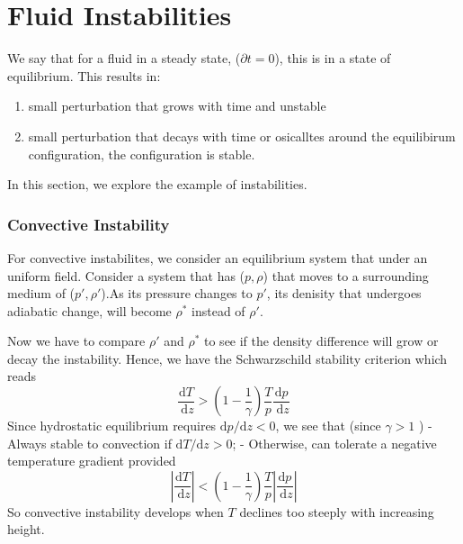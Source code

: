 \documentclass[12pt,a4paper]{article}
\begin{document}
\section{Fluid Instabilities}
We say that for a fluid in a steady state, ($\partial{t} = 0$), this is in a state of equilibrium. This results in:
\begin{enumerate}
    \item small perturbation that grows with time and unstable
    \item small perturbation that decays with time or osicalltes around the equilibirum configuration, the configuration is stable.
\end{enumerate}
In this section, we explore the example of instabilities.
\subsubsection{Convective Instability}
For convective instabilites, we consider an equilibrium system that under an uniform field.
Consider a system that has ($p,\rho$) that moves to a surrounding medium of ($p',\rho'$).As its pressure changes to $p'$, its denisity that undergoes adiabatic change, will become $\rho^{*}$ instead of $\rho'$.

Now we have to compare $\rho'$ and $\rho^{*}$ to see if the density difference will grow or decay the instability.
Hence, we have the Schwarzschild stability criterion which reads
$$
\frac{\mathrm{d} T}{\mathrm{~d} z}>\left(1-\frac{1}{\gamma}\right) \frac{T}{p} \frac{\mathrm{d} p}{\mathrm{~d} z}
$$
Since hydrostatic equilibrium requires $\mathrm{d} p / \mathrm{d} z<0$, we see that (since $\gamma>1$ )
- Always stable to convection if $\mathrm{d} T / \mathrm{d} z>0$;
- Otherwise, can tolerate a negative temperature gradient provided
$$
\left|\frac{\mathrm{d} T}{\mathrm{~d} z}\right|<\left(1-\frac{1}{\gamma}\right) \frac{T}{p}\left|\frac{\mathrm{d} p}{\mathrm{~d} z}\right|
$$
So convective instability develops when $T$ declines too steeply with increasing height.
\end{document}
